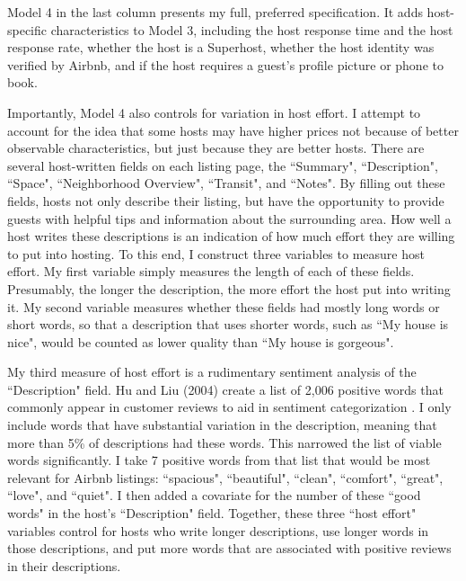 Model 4 in the last column presents my full, preferred specification. It adds host-specific characteristics to Model 3, including the host response time and the host response rate, whether the host is a Superhost, whether the host identity was verified by Airbnb, and if the host requires a guest's profile picture or phone to book. 

Importantly, Model 4 also controls for variation in host effort. I attempt to account for the idea that some hosts may have higher prices not because of better observable characteristics, but just because they are better hosts. There are several host-written fields on each listing page, the ``Summary", ``Description", ``Space", ``Neighborhood Overview", ``Transit", and ``Notes". By filling out these fields, hosts not only describe their listing, but have the opportunity to provide guests with helpful tips and information about the surrounding area. How well a host writes these descriptions is an indication of how much effort they are willing to put into hosting. To this end, I construct three variables to measure host effort. My first variable simply measures the length of each of these fields. Presumably, the longer the description, the more effort the host put into writing it. My second variable measures whether these fields had mostly long words or short words, so that a description that uses shorter words, such as ``My house is nice", would be counted as lower quality than ``My house is gorgeous". 

My third measure of host effort is a rudimentary sentiment analysis of the ``Description" field. Hu and Liu (2004) create a list of 2,006 positive words that commonly appear in customer reviews to aid in sentiment categorization \citep{hu}. I only include words that have substantial variation in the description, meaning that more than 5\% of descriptions had these words. This narrowed the list of viable words significantly. I take 7 positive words from that list that would be most relevant for Airbnb listings: ``spacious", ``beautiful", ``clean", ``comfort", ``great", ``love", and ``quiet". I then added a covariate for the number of these ``good words" in the host's ``Description" field. Together, these three ``host effort" variables control for hosts who write longer descriptions, use longer words in those descriptions, and put more words that are associated with positive reviews in their descriptions. 

